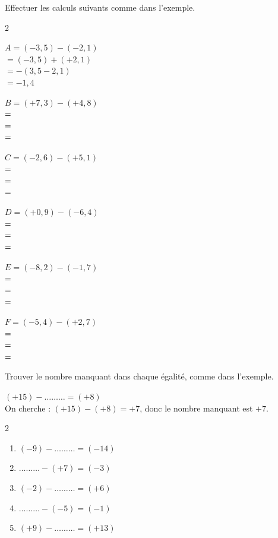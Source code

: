 \documentclass[11pt]{article}
\begin{document}
\begin{exercice}[2]
Effectuer les calculs suivants comme dans l'exemple.

\begin{multicols}{2}

$A = (-3{,}5) - (-2{,}1)$\\
$= (-3{,}5) + (+2{,}1)$\\
$= -(3{,}5 - 2{,}1)$\\
$= -1{,}4$

\bigskip

$B = (+7{,}3) - (+4{,}8)$\\
$= \dotfill$\\
$= \dotfill$\\
$= \dotfill$

\bigskip

$C = (-2{,}6) - (+5{,}1)$\\
$= \dotfill$\\
$= \dotfill$\\
$= \dotfill$

\columnbreak

$D = (+0{,}9) - (-6{,}4)$\\
$= \dotfill$\\
$= \dotfill$\\
$= \dotfill$

\bigskip

$E = (-8{,}2) - (-1{,}7)$\\
$= \dotfill$\\
$= \dotfill$\\
$= \dotfill$

\bigskip

$F = (-5{,}4) - (+2{,}7)$\\
$= \dotfill$\\
$= \dotfill$\\
$= \dotfill$

\end{multicols}
\end{exercice}

\newpage

\begin{exercice}[2][Compléter]
Trouver le nombre manquant dans chaque égalité, comme dans l'exemple.

\begin{exemple}
$(+15) - \ldots\ldots\ldots = (+8)$\\
On cherche : $(+15) - (+8) = +7$, donc le nombre manquant est $+7$.
\end{exemple}

\begin{multicols}{2}
\begin{enumerate}[itemsep=1.5em]
\item $(-9) - \ldots\ldots\ldots = (-14)$
\item $\ldots\ldots\ldots - (+7) = (-3)$
\item $(-2) - \ldots\ldots\ldots = (+6)$
\item $\ldots\ldots\ldots - (-5) = (-1)$
\item $(+9) - \ldots\ldots\ldots = (+13)$
\end{enumerate}
\end{multicols}
\end{exercice}
\end{document}
